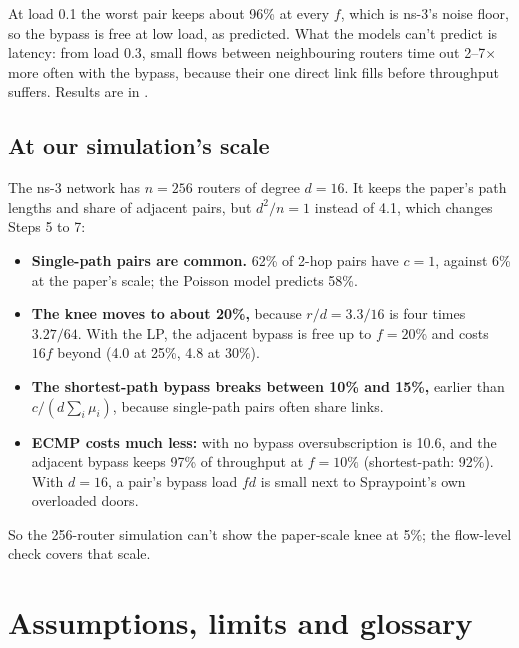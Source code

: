 \documentclass[11pt]{article}
\newcommand{\file}[1]{\path{#1}}
\newcommand{\SigmaMu}{\textstyle\sum_i \mu_i}
\begin{document}
At load 0.1 the worst pair keeps about 96\% at every $f$, which is ns-3's noise floor, so the bypass is free at low load, as predicted. What the models can't predict is latency: from load 0.3, small flows between neighbouring routers time out 2--7$\times$ more often with the bypass, because their one direct link fills before throughput suffers. Results are in \file{docs/ANALYSIS.md}.

\subsection*{At our simulation's scale}

The ns-3 network has $n = 256$ routers of degree $d = 16$. It keeps the paper's path lengths and share of adjacent pairs, but $d^2/n = 1$ instead of 4.1, which changes Steps 5 to 7:
\begin{itemize}
  \item \textbf{Single-path pairs are common.} 62\% of 2-hop pairs have $c = 1$, against 6\% at the paper's scale; the Poisson model predicts 58\%.
  \item \textbf{The knee moves to about 20\%,} because $r/d = 3.3/16$ is four times $3.27/64$. With the LP, the adjacent bypass is free up to $f = 20\%$ and costs $16 f$ beyond (4.0 at 25\%, 4.8 at 30\%).
  \item \textbf{The shortest-path bypass breaks between 10\% and 15\%,} earlier than $c/(d \SigmaMu)$, because single-path pairs often share links.
  \item \textbf{ECMP costs much less:} with no bypass oversubscription is 10.6, and the adjacent bypass keeps 97\% of throughput at $f = 10\%$ (shortest-path: 92\%). With $d = 16$, a pair's bypass load $f d$ is small next to Spraypoint's own overloaded doors.
\end{itemize}
So the 256-router simulation can't show the paper-scale knee at 5\%; the flow-level check covers that scale.

\section*{Assumptions, limits and glossary}
\end{document}

